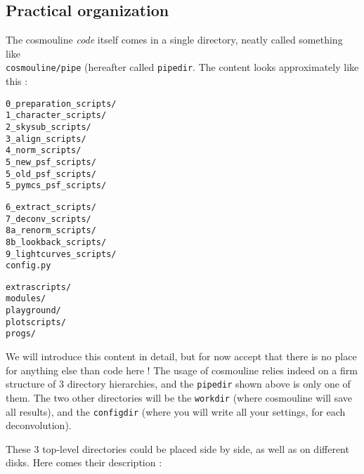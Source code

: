 \subsection{Practical organization}

The cosmouline \emph{code} itself comes in a single directory, neatly called something like\\ \verb+cosmouline/pipe+ (hereafter called \verb+pipedir+. The content looks approximately like this :

\vspace{0.5cm}
\begin{minipage}[t]{4cm}
\begin{verbatim}
0_preparation_scripts/	
1_character_scripts/	
2_skysub_scripts/	
3_align_scripts/	
4_norm_scripts/		
5_new_psf_scripts/
5_old_psf_scripts/
5_pymcs_psf_scripts/
\end{verbatim}
\end{minipage}
\hspace{0.5cm}
\begin{minipage}[t]{4cm}
\begin{verbatim}
6_extract_scripts/	
7_deconv_scripts/
8a_renorm_scripts/
8b_lookback_scripts/
9_lightcurves_scripts/
config.py		
\end{verbatim}
\end{minipage}
\hspace{0.5cm}
\begin{minipage}[t]{4cm}
\begin{verbatim}
extrascripts/
modules/
playground/
plotscripts/
progs/
\end{verbatim}
\end{minipage}
\vspace{0.5cm}

We will introduce this content in detail, but for now accept that there is no place for anything else than code here ! The usage of cosmouline relies indeed on a firm structure of 3 directory hierarchies, and the \verb+pipedir+ shown above is only one of them. The two other directories will be the \verb+workdir+ (where cosmouline will save all results), and the \verb+configdir+ (where you will write all your settings, for each deconvolution).

These 3 top-level directories could be placed side by side, as well as on different disks. Here comes their description :

